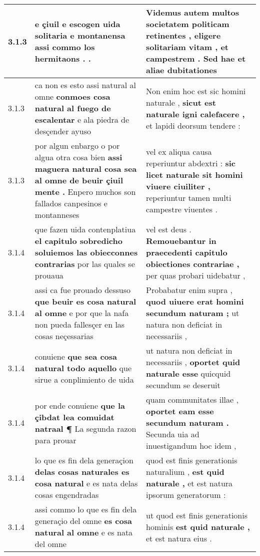 \begin{tabular}{|p{1cm}|p{6.5cm}|p{6.5cm}|}
3.1.3 & e çiuil \textbf{ e escogen uida solitaria e montanensa } assi commo los hermitaons . . & Videmus autem multos societatem politicam retinentes , \textbf{ eligere solitariam vitam , et campestrem . } Sed hae et aliae dubitationes \\\hline
3.1.3 & ca non es esto assi natural al omne \textbf{ conmoes cosa natural al fuego de escalentar } e ala piedra de desçender ayuso & Non enim hoc est sic homini naturale , \textbf{ sicut est naturale igni calefacere , } et lapidi deorsum tendere : \\\hline
3.1.3 & por algun enbargo o por algua otra cosa bien \textbf{ assi maguera natural cosa sea al omne de beuir çiuil mente . } Enpero muchos son fallados canpesinos e montanneses & vel ex aliqua causa reperiuntur abdextri : \textbf{ sic licet naturale sit homini viuere ciuiliter , } reperiuntur tamen multi campestre viuentes . \\\hline
3.1.4 & que fazen uida contenplatiua \textbf{ el capitulo sobredicho soluiemos las obiecconnes contrarias } por las quales se prouaua & vel est deus . \textbf{ Remouebantur in praecedenti capitulo obiectiones contrariae , } per quas probari uidebatur , \\\hline
3.1.4 & assi ca fue prouado dessuso \textbf{ que beuir es cosa natural al omne } e por que la nafa non pueda fallesçer en las cosas neçessarias & Probabatur enim supra , \textbf{ quod uiuere erat homini secundum naturam ; } ut natura non deficiat in necessariis , \\\hline
3.1.4 & conuiene \textbf{ que sea cosa natural todo aquello } que sirue a conplimiento de uida & ut natura non deficiat in necessariis , \textbf{ oportet quid naturale esse } quicquid secundum se deseruit \\\hline
3.1.4 & por ende conuiene \textbf{ que la çibdat lea comuidat natraal ¶ } La segunda razon para prouar & quam communitates illae , \textbf{ oportet eam esse secundum naturam . } Secunda uia ad inuestigandum hoc idem , \\\hline
3.1.4 & lo que es fin dela generaçion \textbf{ delas cosas naturales es cosa natural } e es nata delas cosas engendradas & quod est finis generationis naturalium , \textbf{ est quid naturale , } et est natura ipsorum generatorum : \\\hline
3.1.4 & assi commo lo que es fin dela generaçio del omne \textbf{ es cosa natural al omne } e es nata del omne & ut quod est finis generationis hominis \textbf{ est quid naturale , } et est natura eius . \\\hline

\end{tabular}
